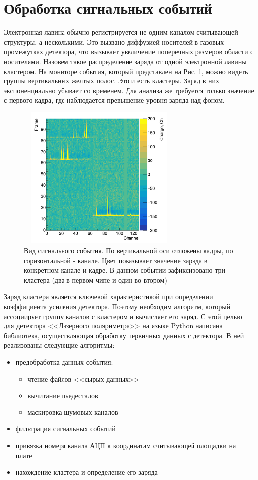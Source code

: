 \section{Обработка сигнальных событий}
Электронная лавина обычно регистрируется не одним каналом считывающей структуры, а несколькими. Это вызвано диффузией носителей в газовых промежутках детектора, что вызывает увеличение поперечных размеров области с носителями. Назовем такое распределение заряда от одной электронной лавины кластером. На мониторе события, который представлен на Рис. \ref{event_map}, можно видеть группы вертикальных желтых полос. Это и есть кластеры. Заряд в них экспоненциально убывает со временем. Для анализа же требуется только значение с первого кадра, где наблюдается превышение уровня заряда над фоном.   
\begin{figure}[H]
	\begin{center}
		\includegraphics[width = 8cm, height = 7cm]{img/Signal.png}
		\caption{Вид сигнального события. По вертикальной оси отложены кадры, по горизонтальной - канале. Цвет показывает значение заряда в конкретном канале и кадре. В данном событии зафиксировано три кластера (два в первом чипе и один во втором)}
		\label{event_map}
	\end{center}
\end{figure}
 Заряд кластера является ключевой характеристикой при определении коэффициента усиления детектора. Поэтому необходим алгоритм, который ассоциирует группу каналов с кластером и вычисляет его заряд. С этой целью для детектора <<Лазерного поляриметра>> на языке Python написана библиотека, осуществляющая обработку первичных данных с детектора. В ней реализованы следующие алгоритмы:
 \begin{itemize}
 	\item предобработка данных события:
 	\begin{itemize}[label=$\circ$]
 		\item чтение файлов <<сырых данных>>
 		\item вычитание пьедесталов
 		\item маскировка шумовых каналов
 	\end{itemize}
 	\item фильтрация сигнальных событий
 	\item привязка номера канала АЦП к координатам считывающей площадки на плате
 	\item нахождение кластера и определение его заряда
 \end{itemize}
